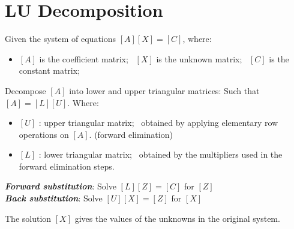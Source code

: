 \section*{LU Decomposition}
Given the system of equations $[A][X] = [C]$, where:
\vspace{-0.5\baselineskip}
\begin{itemize}[parsep=0.25em]
   \item $[A]$ is the coefficient matrix; \quad
   \gray{$\bullet$} \ $[X]$ is the unknown matrix; \quad
   \gray{$\bullet$} \ $[C]$ is the constant matrix; \quad
\end{itemize}
   
Decompose $[A]$ into lower and upper triangular matrices: Such that $[A] = [L][U]$. 
Where:
\vspace{-0.5\baselineskip}
\begin{itemize}[parsep=0.25em]
   \item $[U]$ : upper triangular matrix; \ obtained by applying elementary row operations on $[A]$. (forward elimination)
   \item $[L]$ : lower triangular matrix; \ obtained by the multipliers used in the forward elimination steps.
\end{itemize}


\textbf{\textit{Forward substitution}}: Solve $[L][Z] = [C]$ for $[Z]$ \\[0.5em]
\textbf{\textit{Back substitution}}: Solve $[U][X] = [Z]$ for $[X]$
   
The solution $[X]$ gives the values of the unknowns in the original system.





